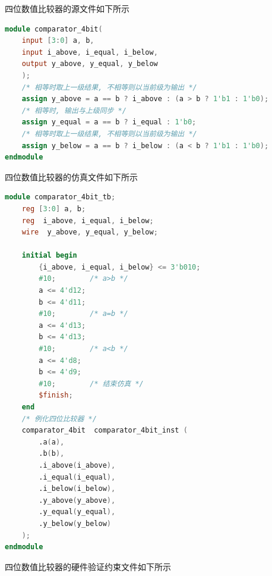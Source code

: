 \documentclass{article}
\begin{document}
四位数值比较器的源文件如下所示\\
\begin{lstlisting}[language=Verilog, caption={四位数值比较器源文件}]
module comparator_4bit(
    input [3:0] a, b,
    input i_above, i_equal, i_below,
    output y_above, y_equal, y_below
    );
    /* 相等时取上一级结果, 不相等则以当前级为输出 */
    assign y_above = a == b ? i_above : (a > b ? 1'b1 : 1'b0);
    /* 相等时, 输出与上级同步 */
    assign y_equal = a == b ? i_equal : 1'b0;
    /* 相等时取上一级结果, 不相等则以当前级为输出 */          
    assign y_below = a == b ? i_below : (a < b ? 1'b1 : 1'b0);
endmodule
\end{lstlisting}
四位数值比较器的仿真文件如下所示\\
\begin{lstlisting}[language=Verilog, caption={四位数值比较器仿真文件}]
module comparator_4bit_tb;
    reg [3:0] a, b;
    reg  i_above, i_equal, i_below;
    wire  y_above, y_equal, y_below;

    initial begin
        {i_above, i_equal, i_below} <= 3'b010;
        #10;        /* a>b */
        a <= 4'd12;
        b <= 4'd11;
        #10;        /* a=b */
        a <= 4'd13;
        b <= 4'd13;
        #10;        /* a<b */
        a <= 4'd8;
        b <= 4'd9;
        #10;        /* 结束仿真 */
        $finish;
    end
    /* 例化四位比较器 */
    comparator_4bit  comparator_4bit_inst (
        .a(a),
        .b(b),
        .i_above(i_above),
        .i_equal(i_equal),
        .i_below(i_below),
        .y_above(y_above),
        .y_equal(y_equal),
        .y_below(y_below)
    );
endmodule
\end{lstlisting}
四位数值比较器的硬件验证约束文件如下所示\\
\end{document}
